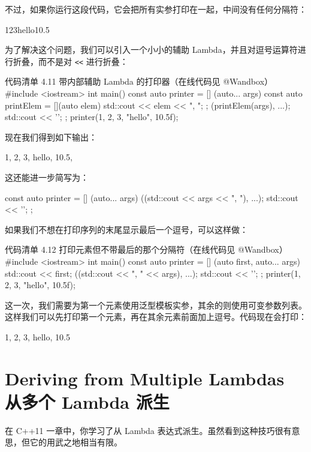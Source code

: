 不过，如果你运行这段代码，它会把所有实参打印在一起，中间没有任何分隔符：

\begin{codebox}
123hello10.5
\end{codebox}

为了解决这个问题，我们可以引入一个小小的辅助 Lambda，并且对逗号运算符进行折叠，而不是对 \texttt{<<} 进行折叠：

\begin{codeboxt}{代码清单 4.11 带内部辅助 Lambda 的打印器（在线代码见 @Wandbox）}
#include <iostream>
int main() {
const auto printer = [] (auto... args) {
const auto printElem = [](auto elem) {
std::cout << elem << ", ";
};
(printElem(args), ...);
std::cout << '\n';
};
printer(1, 2, 3, "hello", 10.5f);
}
\end{codeboxt}

现在我们得到如下输出：

\begin{codebox}
1, 2, 3, hello, 10.5,
\end{codebox}

这还能进一步简写为：

\begin{codebox}
const auto printer = [] (auto... args) {
((std::cout << args << ", "), ...);
std::cout << '\n';
};
\end{codebox}

如果我们不想在打印序列的末尾显示最后一个逗号，可以这样做：

\begin{codeboxt}{代码清单 4.12 打印元素但不带最后的那个分隔符（在线代码见 @Wandbox）}
#include <iostream>
int main() {
const auto printer = [] (auto first, auto... args) {
std::cout << first;
((std::cout << ", " << args), ...);
std::cout << '\n';
};
printer(1, 2, 3, "hello", 10.5f);
}
\end{codeboxt}

这一次，我们需要为第一个元素使用泛型模板实参，其余的则使用可变参数列表。这样我们可以先打印第一个元素，再在其余元素前面加上逗号。代码现在会打印：

\begin{codebox}
1, 2, 3, hello, 10.5
\end{codebox}

\section{Deriving from Multiple Lambdas 从多个 Lambda 派生}

在 C++11 一章中，你学习了从 Lambda 表达式派生。虽然看到这种技巧很有意思，但它的用武之地相当有限。

